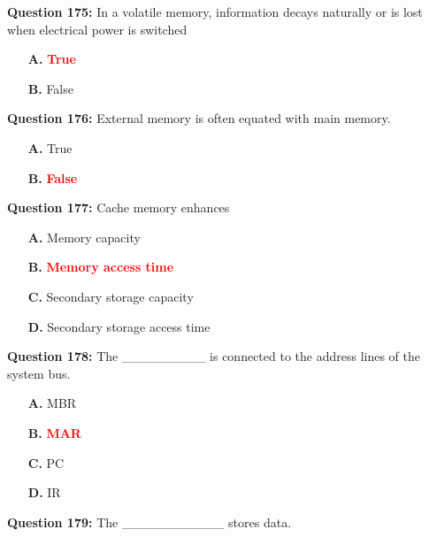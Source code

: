 \documentclass[12pt,a4paper]{article}
\begin{document}
\vspace{0.5cm}

\textbf{Question 175:} In a volatile memory, information decays naturally or is lost when electrical power is switched

\begin{itemize}
    \item[\textbf{A.}] \textcolor{red}{\textbf{True}}
    \item[\textbf{B.}] False
\end{itemize}

\vspace{0.5cm}

\textbf{Question 176:} External memory is often equated with main memory.

\begin{itemize}
    \item[\textbf{A.}] True
    \item[\textbf{B.}] \textcolor{red}{\textbf{False}}
\end{itemize}

\vspace{0.5cm}

\textbf{Question 177:} Cache memory enhances

\begin{itemize}
    \item[\textbf{A.}] Memory capacity
    \item[\textbf{B.}] \textcolor{red}{\textbf{Memory access time}}
    \item[\textbf{C.}] Secondary storage capacity
    \item[\textbf{D.}] Secondary storage access time
\end{itemize}

\vspace{0.5cm}

\textbf{Question 178:} The _________ is connected to the address lines of the system bus.

\begin{itemize}
    \item[\textbf{A.}] MBR
    \item[\textbf{B.}] \textcolor{red}{\textbf{MAR}}
    \item[\textbf{C.}] PC
    \item[\textbf{D.}] IR
\end{itemize}

\vspace{0.5cm}

\textbf{Question 179:} The ___________ stores data.
\end{document}
